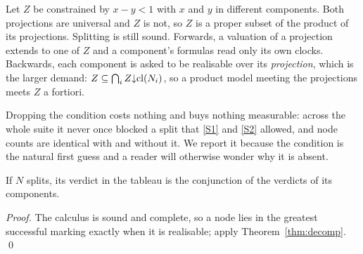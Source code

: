 \begin{remark}\label{rem:noproduct}
Let $Z$ be constrained by $x-y<1$ with $x$ and $y$ in different components. Both
projections are universal and $Z$ is not, so $Z$ is a proper subset of the
product of its projections. Splitting is still sound. Forwards, a valuation of a
projection extends to one of $Z$ and a component's formulas read only its own
clocks. Backwards, each component is asked to be realisable over its
\emph{projection}, which is the larger demand: $Z\subseteq\bigcap_i
Z{\downarrow}\mathrm{cl}(N_i)$, so a product model meeting the projections meets $Z$ a
fortiori.

Dropping the condition costs nothing and buys nothing measurable: across the
whole suite it never once blocked a split that \ref{S1} and \ref{S2} allowed,
and node counts are identical with and without it. We report it because the
condition is the natural first guess and a reader will otherwise wonder why it
is absent.
\end{remark}

\begin{corollary}\label{cor:search}
If $N$ splits, its verdict in the tableau is the conjunction of the verdicts of
its components.
\end{corollary}

\begin{proof}
The calculus is sound and complete, so a node lies in the greatest successful
marking exactly when it is realisable; apply Theorem~\ref{thm:decomp}. \qed
\end{proof}
